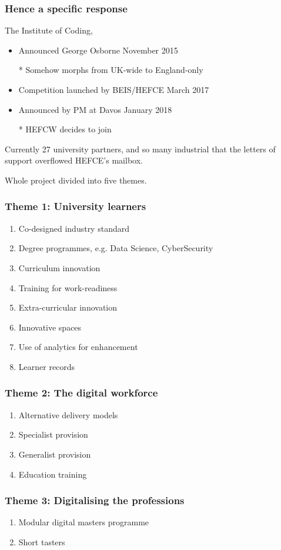 \documentclass[handout]{beamer}   %
\begin{document}
\begin{frame}[fragile]
\frametitle{Hence a specific response}
\pause
The Institute of Coding,\pause 
\begin{itemize}[<+->]
\item Announced George Osborne November 2015 \cite{HMG2015a}
\item[*]Somehow morphs from UK-wide to England-only
\item Competition launched by BEIS/HEFCE March 2017 \cite{BEIS2017a}
\item Announced  by PM at Davos January 2018 \cite{HMG2018a}
\item[*]HEFCW decides to join
\end{itemize}
\pause Currently 27 university partners\pause, and so many industrial that the letters of support overflowed HEFCE's mailbox.
\par
\pause
Whole project divided into five themes.
\end{frame}
\begin{frame}[fragile]
\frametitle{Theme 1: University learners}
\begin{enumerate}[<+->]
\item Co-designed industry standard 
\item Degree programmes, e.g. Data Science, CyberSecurity
\item Curriculum innovation 
\item Training for work-readiness 
\item Extra-curricular innovation 
\item Innovative spaces 
\item Use of analytics for enhancement 
\item Learner records 
\end{enumerate}
\end{frame}
\begin{frame}[fragile]
\frametitle{Theme 2: The digital workforce }
\begin{enumerate}[<+->]
\item Alternative delivery models 
\item Specialist provision 
\item Generalist provision 
\item Education training 
\end{enumerate}
\end{frame}
\begin{frame}[fragile]
\frametitle{Theme 3: Digitalising the professions }
\begin{enumerate}[<+->]
\item Modular digital masters programme 
\item Short tasters
\end{enumerate}
\end{frame}
\end{document}
